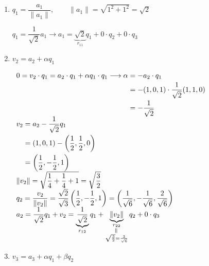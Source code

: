 \begin{enumerate}[label=\color{lightblue}\arabic*{$^\circ$})]
	\item $q_1=\dfrac{a_1}{\|a_1\|},\qquad\|a_1\|=\sqrt{1^2+1^2}=\sqrt{2}$
	
	$q_1=\dfrac{1}{\sqrt{2}}a_1\longrightarrow a_1=\underbrace{\sqrt{2}}_{r_{11}}q_1+0\cdot q_2+0\cdot q_3$
	\item $v_2=a_2+\alpha q_1$
	
	$\begin{array}{l}
		\begin{aligned}
			0=v_2\cdot q_1=a_2\cdot q_1+\alpha q_1\cdot q_1\longrightarrow\alpha&=-a_2\cdot q_1\\
			&=-(1,0,1)\cdot\dfrac{1}{\sqrt{2}}(1,1,0)\\
			&=-\dfrac{1}{\sqrt{2}}
		\end{aligned}\\
		\begin{aligned}
			v_2&=a_2-\dfrac{1}{\sqrt{2}}q_1\\
			&=(1,0,1)-\left(\dfrac{1}{2},\dfrac{1}{2},0\right)\\
			&=\left(\dfrac{1}{2},-\dfrac{1}{2},1\right)
		\end{aligned}\\
		\|v_2\|=\sqrt{\dfrac{1}{4}+\dfrac{1}{4}+1}=\sqrt{\dfrac{3}{2}}\\
		q_2=\dfrac{v_2}{\|v_2\|}=\dfrac{\sqrt{2}}{\sqrt{3}}\left(\dfrac{1}{2},-\dfrac{1}{2},1\right)=\left(\dfrac{1}{\sqrt{6}},-\dfrac{1}{\sqrt{6}},\dfrac{2}{\sqrt{6}}\right)\\
		a_2=\dfrac{1}{\sqrt{2}}q_1+v_2=\underbrace{\dfrac{1}{\sqrt{2}}}_{r_{12}}q_1+\underbrace{\|v_2\|}_{\begin{subarray}{c}
				r_{22}\\
				\rotatebox{90}{=}\\
				\sqrt{\frac{3}{2}}=\frac{3}{\sqrt{6}}
		\end{subarray}}q_2+0\cdot q_3
	\end{array}$
	\item $v_3=a_3+\alpha q_1+\beta q_2$
	

\end{enumerate}
